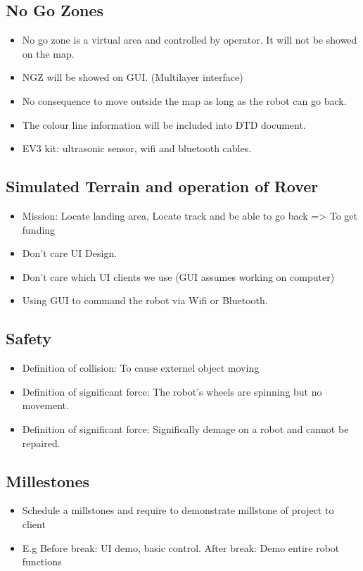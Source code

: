 \documentclass[11pt, a4paper]{article}
\begin{document}
\subsection{No Go Zones}
\begin{itemize}
\item No go zone is a virtual area and controlled by operator. It will not be showed on the map. 
\item NGZ will be showed on GUI. (Multilayer interface)
\item No consequence to move outside the map as long as the robot can go back.
\item The colour line information will be included into DTD document.
\item EV3 kit: ultrasonic sensor, wifi and bluetooth cables.
\end{itemize}

\subsection{Simulated Terrain and operation of Rover}
\begin{itemize}
\item Mission: Locate landing area, Locate track and be able to go back => To get funding
\item Don't care UI Design.
\item Don't care which UI clients we use (GUI assumes working on computer)
\item Using GUI to command the robot via Wifi or Bluetooth.
 
\end{itemize}

\subsection{Safety}
\begin{itemize}
\item Definition of collision: To cause externel object moving
\item Definition of significant force: The robot's wheels are spinning but no movement.
\item Definition of significant force: Significally demage on a robot and cannot be repaired.
\end{itemize}

\subsection{Millestones}
\begin{itemize}
\item Schedule a millstones and require to demonstrate millstone of project to client
\item E.g Before break: UI demo, basic control. After break: Demo entire robot functions
\end{itemize}
\end{document}
